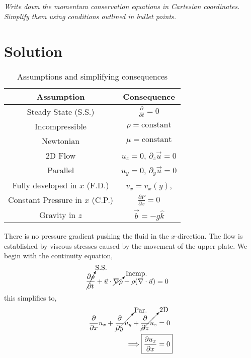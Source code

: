 \section{}
\textit{Write down the momentum conservation equations in Cartesian coordinates. Simplify them using conditions outlined in bullet points.}
\section*{Solution}
\begin{table}[h]
    \centering
    \caption{Assumptions and simplifying consequences}
    \begin{tabular}{cc}
        \hline
        \textbf{Assumption} & \textbf{Consequence} \\
        \hline
        Steady State (S.S.) & $\frac{\partial}{\partial t} = 0$ \\
        Incompressible & $\rho = \text{constant}$ \\
        Newtonian & $\mu = \text{constant}$ \\
        2D Flow & $u_z = 0$, $\partial_z \vec{u} = 0$ \\
        Parallel & $u_y = 0$, $\partial_y \vec{u} = 0$ \\
        Fully developed in $x$ (F.D.) & $v_x = v_x(y)$, \\
        Constant Pressure in $x$ (C.P.) & $\frac{\partial P}{\partial x} = 0$ \\
        Gravity in $z$ & $\vec{b} = -g \hat{k}$ \\
        \hline
    \end{tabular}
    \label{tab:Q2assumptions}
\end{table}
There is no pressure gradient pushing the fluid in the $x$-direction. The flow is established by viscous stresses caused by the movement of the upper plate. 
\FloatBarrier
We begin with the continuity equation,
\begin{align*}
    \cancelto{\text{S.S.}}{\frac{\partial \rho}{\partial t}} + \vec{u} \cdot \cancelto{\text{Incmp.}}{ \nabla \rho} +\rho (\nabla \cdot \vec{u}) &= 0
\end{align*}
this simplifies to,
\begin{align*}
    \frac{\partial}{\partial x} u_x + \cancelto{\text{Par.}}{\frac{\partial}{\partial y} u_y} + \cancelto{\text{2D}}{\frac{\partial}{\partial z} u_z} &= 0 \\
    \implies \Aboxed{\frac{\partial u_x}{\partial x} &= 0}
\end{align*}
